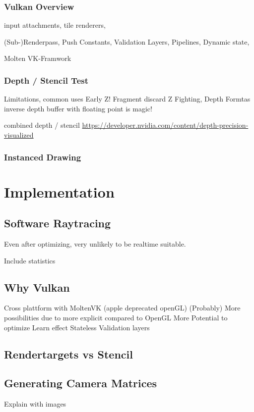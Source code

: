 \subsubsection{Vulkan Overview}
input attachments, tile renderers,

(Sub-)Renderpass, Push Constants, Validation Layers, Pipelines, Dynamic state,

Molten VK-Framwork

\subsubsection{Depth / Stencil Test}
Limitations, common uses
Early Z! Fragment discard
Z Fighting,
Depth Formtas
inverse depth buffer with floating point is magic!

combined depth / stencil
\url{https://developer.nvidia.com/content/depth-precision-visualized}


\subsubsection{Instanced Drawing}

\section{Implementation}

\subsection{Software Raytracing}
Even after optimizing, very unlikely to be realtime suitable. 

Include statistics

\subsection{Why Vulkan}
Cross plattform with MoltenVK (apple deprecated openGL)
(Probably) More possibilities due to more explicit compared to OpenGL
More Potential to optimize
Learn effect
Stateless
Validation layers

\subsection{Rendertargets vs Stencil}

\subsection{Generating Camera Matrices}
Explain with images
